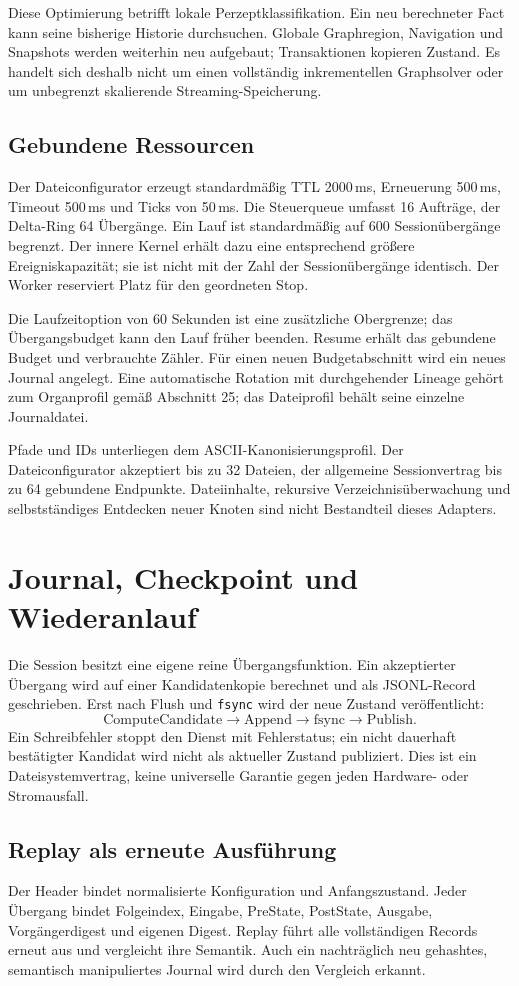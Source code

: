 \documentclass[11pt,a4paper]{article}
\newcommand{\nextsection}[2]{\clearpage{\color{accent}\small\textsf{#1}}\section{#2}}
\begin{document}
Diese Optimierung betrifft lokale Perzeptklassifikation.
Ein neu berechneter Fact kann seine bisherige Historie durchsuchen.
Globale Graphregion, Navigation und Snapshots werden weiterhin
neu aufgebaut; Transaktionen kopieren Zustand. Es handelt sich
deshalb nicht um einen vollständig inkrementellen Graphsolver
oder um unbegrenzt skalierende Streaming-Speicherung.

\subsection{Gebundene Ressourcen}
Der Dateiconfigurator erzeugt standardmäßig TTL 2000\,ms,
Erneuerung 500\,ms, Timeout 500\,ms und Ticks von 50\,ms.
Die Steuerqueue umfasst 16 Aufträge, der Delta-Ring 64 Übergänge.
Ein Lauf ist standardmäßig auf 600 Sessionübergänge begrenzt.
Der innere Kernel erhält dazu eine entsprechend größere
Ereigniskapazität; sie ist nicht mit der Zahl der Sessionübergänge
identisch. Der Worker reserviert Platz für den geordneten Stop.

Die Laufzeitoption von 60 Sekunden ist eine zusätzliche Obergrenze;
das Übergangsbudget kann den Lauf früher beenden. Resume erhält
das gebundene Budget und verbrauchte Zähler. Für einen neuen
Budgetabschnitt wird ein neues Journal angelegt. Eine automatische
Rotation mit durchgehender Lineage gehört zum Organprofil
gemäß Abschnitt 25; das Dateiprofil behält seine einzelne Journaldatei.

Pfade und IDs unterliegen dem ASCII-Kanonisierungsprofil.
Der Dateiconfigurator akzeptiert bis zu 32 Dateien, der allgemeine
Sessionvertrag bis zu 64 gebundene Endpunkte. Dateiinhalte,
rekursive Verzeichnisüberwachung und selbstständiges Entdecken
neuer Knoten sind nicht Bestandteil dieses Adapters.

\nextsection{17 / FORTSETZBARES GEDÄCHTNIS}{Journal, Checkpoint und Wiederanlauf}
Die Session besitzt eine eigene reine Übergangsfunktion.
Ein akzeptierter Übergang wird auf einer Kandidatenkopie
berechnet und als JSONL-Record geschrieben. Erst nach
Flush und \texttt{fsync} wird der neue Zustand veröffentlicht:
\[
\mathrm{ComputeCandidate}\to\mathrm{Append}\to\mathrm{fsync}
\to\mathrm{Publish}.
\]
Ein Schreibfehler stoppt den Dienst mit Fehlerstatus; ein nicht
dauerhaft bestätigter Kandidat wird nicht als aktueller Zustand
publiziert. Dies ist ein Dateisystemvertrag, keine universelle
Garantie gegen jeden Hardware- oder Stromausfall.

\subsection{Replay als erneute Ausführung}
Der Header bindet normalisierte Konfiguration und Anfangszustand.
Jeder Übergang bindet Folgeindex, Eingabe, PreState, PostState,
Ausgabe, Vorgängerdigest und eigenen Digest. Replay führt
alle vollständigen Records erneut aus und vergleicht ihre
Semantik. Auch ein nachträglich neu gehashtes, semantisch
manipuliertes Journal wird durch den Vergleich erkannt.
\end{document}
